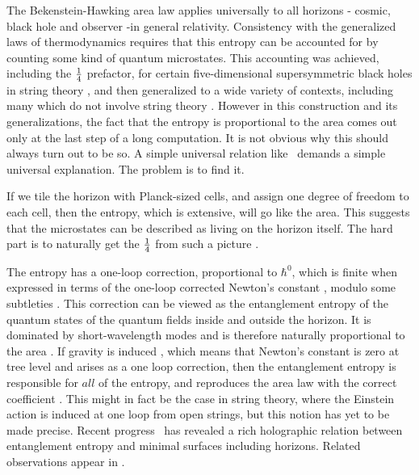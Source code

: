      The Bekenstein-Hawking area law 
\eqn{}
applies universally to all horizons - cosmic, black hole and observer -in general relativity. Consistency with the generalized laws of thermodynamics requires that this entropy can be accounted for by counting some kind of quantum microstates.  This accounting  was achieved,
including the ${1\over 4}$ prefactor,  
for certain five-dimensional supersymmetric black holes in string theory \ascv, and then generalized to a wide variety of contexts, including many which do not involve string theory \peet. However in this construction and its generalizations, the fact that the entropy is proportional to the area comes out only at the last step of a long computation. It is not obvious why this should always turn out to be so. A simple universal relation like \dft\  demands a simple universal explanation.  The problem is to find it. 
 
 If we tile the horizon with Planck-sized cells, and assign one degree of freedom to each cell, then the entropy, which is extensive, will go like the area. This suggests that the microstates can be described as living  on the horizon itself.  The hard part is to naturally get the ${1 \over 4}$ from such a picture \rov.

 The entropy has a one-loop correction, proportional to $\hbar^0$, which is finite when expressed in terms of the one-loop corrected 
Newton's constant \sussum, modulo some subtleties \jacb. This correction can be viewed as the entanglement entropy of the quantum states of the quantum fields inside and outside the horizon. It is dominated by short-wavelength modes and is therefore naturally 
proportional to the area \sred.  If gravity is induced \sak, which means that Newton's constant is zero at tree level and arises as a one loop correction, then the entanglement entropy  is responsible for $all$ of the entropy, and reproduces the area law with the correct coefficient .  This might in fact be the case in string theory, where the Einstein action is induced at one loop from open strings, but this notion has yet to be made precise.  Recent progress \tak\ has revealed a rich 
holographic relation between entanglement entropy and minimal surfaces including horizons. Related observations appear in \mhs.

